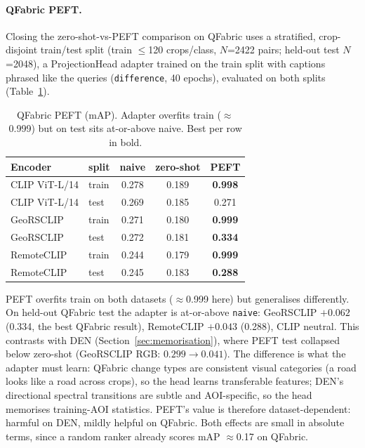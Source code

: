 \documentclass{article}
\begin{document}
\paragraph{QFabric PEFT.}
\label{sec:qfabricpeft}
Closing the zero-shot-vs-PEFT comparison on QFabric uses a stratified,
crop-disjoint train/test split (train $\leq$120 crops/class, $N$=2422 pairs;
held-out test $N$=2048), a ProjectionHead adapter trained on the train split with
captions phrased like the queries (\texttt{difference}, 40 epochs), evaluated on
both splits (Table~\ref{tab:qfabricpeft}).

\begin{table}[H]
    \centering
    \caption{QFabric PEFT (mAP). Adapter overfits train ($\approx$0.999) but on
    test sits at-or-above naive. Best per row in bold.}
    \label{tab:qfabricpeft}
    \begin{tabular}{llccc}
        \toprule
        \textbf{Encoder} & \textbf{split} & \textbf{naive} & \textbf{zero-shot} & \textbf{PEFT} \\
        \midrule
        CLIP ViT-L/14 & train & 0.278 & 0.189 & \textbf{0.998} \\
        CLIP ViT-L/14 & test  & 0.269 & 0.185 & 0.271 \\
        GeoRSCLIP     & train & 0.271 & 0.180 & \textbf{0.999} \\
        GeoRSCLIP     & test  & 0.272 & 0.181 & \textbf{0.334} \\
        RemoteCLIP    & train & 0.244 & 0.179 & \textbf{0.999} \\
        RemoteCLIP    & test  & 0.245 & 0.183 & \textbf{0.288} \\
        \bottomrule
    \end{tabular}
\end{table}

PEFT overfits train on both datasets ($\approx$0.999 here) but generalises
differently. On held-out QFabric test the adapter is at-or-above \texttt{naive}:
GeoRSCLIP $+0.062$ (0.334, the best QFabric result), RemoteCLIP $+0.043$ (0.288),
CLIP neutral. This contrasts with DEN (Section~\ref{sec:memorisation}), where PEFT
test collapsed below zero-shot (GeoRSCLIP RGB: $0.299 \rightarrow 0.041$). The
difference is what the adapter must learn: QFabric change types are consistent
visual categories (a road looks like a road across crops), so the head learns
transferable features; DEN's directional spectral transitions are subtle and
AOI-specific, so the head memorises training-AOI statistics. PEFT's value is
therefore dataset-dependent: harmful on DEN, mildly helpful on QFabric. Both
effects are small in absolute terms, since a random ranker already scores mAP
$\approx$0.17 on QFabric.
\end{document}

